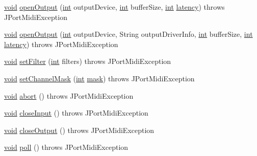 \begin{DoxyCompactItemize}
\item 
\hyperlink{sound_8c_ae35f5844602719cf66324f4de2a658b3}{void} \hyperlink{classjportmidi_1_1_j_port_midi_a3b4b4f00f23f1fc87b4b5a99277e3222}{open\+Output} (\hyperlink{xmltok_8h_a5a0d4a5641ce434f1d23533f2b2e6653}{int} output\+Device, \hyperlink{xmltok_8h_a5a0d4a5641ce434f1d23533f2b2e6653}{int} buffer\+Size, \hyperlink{xmltok_8h_a5a0d4a5641ce434f1d23533f2b2e6653}{int} \hyperlink{portmidi_2pm__test_2test_8c_abe13b7efd223bb5d20e2f3710b43bcd2}{latency})  throws J\+Port\+Midi\+Exception      
\item 
\hyperlink{sound_8c_ae35f5844602719cf66324f4de2a658b3}{void} \hyperlink{classjportmidi_1_1_j_port_midi_a964dc3c6390770f18803b5ad8c10c75a}{open\+Output} (\hyperlink{xmltok_8h_a5a0d4a5641ce434f1d23533f2b2e6653}{int} output\+Device, String output\+Driver\+Info, \hyperlink{xmltok_8h_a5a0d4a5641ce434f1d23533f2b2e6653}{int} buffer\+Size, \hyperlink{xmltok_8h_a5a0d4a5641ce434f1d23533f2b2e6653}{int} \hyperlink{portmidi_2pm__test_2test_8c_abe13b7efd223bb5d20e2f3710b43bcd2}{latency})  throws J\+Port\+Midi\+Exception 
\item 
\hyperlink{sound_8c_ae35f5844602719cf66324f4de2a658b3}{void} \hyperlink{classjportmidi_1_1_j_port_midi_af01c7205c2d4aa948bc78524a67a4fad}{set\+Filter} (\hyperlink{xmltok_8h_a5a0d4a5641ce434f1d23533f2b2e6653}{int} filters)  throws J\+Port\+Midi\+Exception 
\item 
\hyperlink{sound_8c_ae35f5844602719cf66324f4de2a658b3}{void} \hyperlink{classjportmidi_1_1_j_port_midi_af97523c80b9561d65f4aabe182fcd6ef}{set\+Channel\+Mask} (\hyperlink{xmltok_8h_a5a0d4a5641ce434f1d23533f2b2e6653}{int} \hyperlink{structmask}{mask})  throws J\+Port\+Midi\+Exception 
\item 
\hyperlink{sound_8c_ae35f5844602719cf66324f4de2a658b3}{void} \hyperlink{classjportmidi_1_1_j_port_midi_a800c15f35a1e85552d630ab7dff9cc54}{abort} ()  throws J\+Port\+Midi\+Exception 
\item 
\hyperlink{sound_8c_ae35f5844602719cf66324f4de2a658b3}{void} \hyperlink{classjportmidi_1_1_j_port_midi_afd794dfd9a693af25e60700dac277821}{close\+Input} ()  throws J\+Port\+Midi\+Exception 
\item 
\hyperlink{sound_8c_ae35f5844602719cf66324f4de2a658b3}{void} \hyperlink{classjportmidi_1_1_j_port_midi_a7eac128b23700435a8b9a6f2ee8309b1}{close\+Output} ()  throws J\+Port\+Midi\+Exception 
\item 
\hyperlink{sound_8c_ae35f5844602719cf66324f4de2a658b3}{void} \hyperlink{classjportmidi_1_1_j_port_midi_a2e72f4d0559a054948b01e6eba37b00f}{poll} ()  throws J\+Port\+Midi\+Exception 

\end{DoxyCompactItemize}
